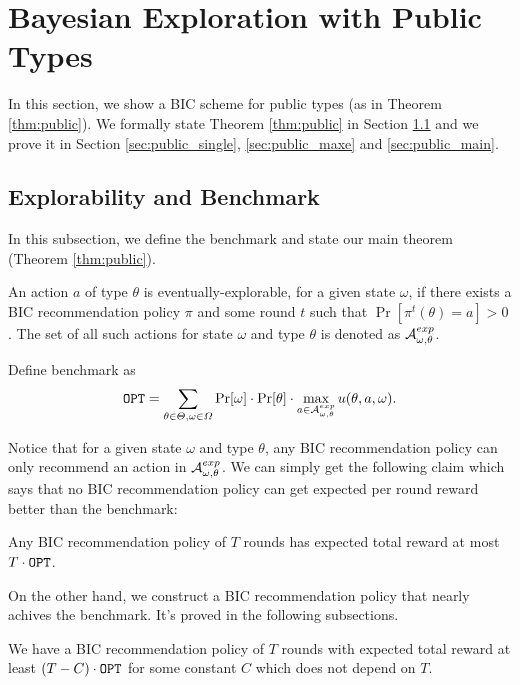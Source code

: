 
\section{Bayesian Exploration with Public Types}
\label{sec:public}
In this section, we show a BIC scheme for public types (as in Theorem \ref{thm:public}). We formally state Theorem \ref{thm:public} in Section \ref{sec:public_bench} and we prove it in Section \ref{sec:public_single}, \ref{sec:public_maxe} and \ref{sec:public_main}.

\subsection{Explorability and Benchmark}
\label{sec:public_bench}
In this subsection, we define the benchmark and state our main theorem (Theorem \ref{thm:public}).

\begin{definition}
\label{def:public_exp}
An action $a$ of type $\theta$ is eventually-explorable, for a given state $\omega$, if there exists a BIC recommendation policy $\pi$ and some round $t$ such that $\Pr[\pi^t(\theta)= a]> 0$. The set of all such actions for state $\omega$ and type $\theta$ is denoted as $\mathcal{A}_{\omega,\theta}^{exp}$.
\end{definition}

\begin{definition}[Benchmark]
Define benchmark as
\[
\mathtt{OPT} = \sum_{\theta \in \varTheta, \omega\in \varOmega} \Pr[\omega] \cdot \Pr[\theta] \cdot \max_{a \in \mathcal{A}_{\omega,\theta}^{exp}} u(\theta, a, \omega).
\]
\end{definition}

Notice that for a given state $\omega$ and type $\theta$, any BIC recommendation policy can only recommend an action in $\mathcal{A}_{\omega,\theta}^{exp}$. We can simply get the following claim which says that no BIC recommendation policy can get expected per round reward better than the benchmark:
\begin{claim}
Any BIC recommendation policy of $T$ rounds has expected total reward at most $T \cdot\mathtt{OPT}$.
\end{claim}

On the other hand, we construct a BIC recommendation policy that nearly achives the benchmark. It's proved in the following subsections.
\begin{theorem}
\label{thm:public}
We have a BIC recommendation policy of $T$ rounds with expected total reward at least $\left(T - C \right) \cdot \mathtt{OPT}$ for some constant $C$ which does not depend on $T$.
\end{theorem}

